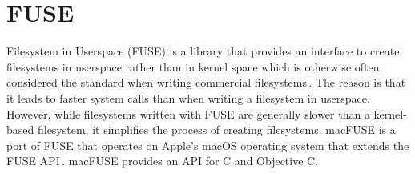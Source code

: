 \section{FUSE}
Filesystem in Userspace (FUSE) is a library that provides an interface to create filesystems in userspace rather than in kernel space which is otherwise often considered the standard when writing commercial filesystems\,\cite{Libfuse2021}. The reason is that it leads to faster system calls than when writing a filesystem in userspace. However, while filesystems written with FUSE are generally slower than a kernel-based filesystem, it simplifies the process of creating filesystems. macFUSE is a port of FUSE that operates on Apple's macOS operating system that extends the FUSE API\,\cite{HomeMacFUSE}. macFUSE provides an API for C and Objective C.